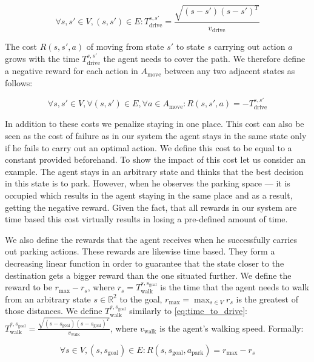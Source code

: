 \begin{equation}
\label{eq:time_to_drive}
\forall s,s' \in V, (s, s') \in E: T_{\mathrm{drive}}^{s,s'}
= \frac{\sqrt{(s - s') {(s - s')}^T}}{v_{\mathrm{drive}}}
\end{equation}

The cost $R(s, s', a)$ of moving from state $s'$ to state $s$ carrying out
action $a$ grows with the time $T_{\mathrm{drive}}^{s,s'}$ the agent needs to cover the path. We therefore
define a negative reward for each action in $A_{\mathrm{move}}$ between any two
adjacent states as follows:

\begin{equation}
\forall s,s' \in V, \forall (s, s') \in E, \forall a \in A_{\mathrm{move}}: R(s, s', a) = -T_{\mathrm{drive}}^{s,s'}
\end{equation}

In addition to these costs we penalize staying in one place. This cost can
also be seen as the cost of failure as in our system the agent stays in the
same state only if he fails to carry out an optimal action. We define this
cost to be equal to a constant provided beforehand. To show the impact of this
cost let us consider an example. The agent stays in an arbitrary state and
thinks that the best decision in this state is to park. However, when he
observes the parking space --- it is occupied which results in the agent
staying in the same place and as a result, getting the negative reward. Given
the fact, that all rewards in our system are time based this cost virtually
results in losing a pre-defined amount of time.

We also define the rewards that the agent receives when he successfully
carries out parking actions. These rewards are likewise time based. They form
a decreasing linear function in order to guarantee that the state closer to
the destination gets a bigger reward than the one situated further. We define
the reward to be $r_{\max} - r_s$, where $r_s = T_{\mathrm{walk}}^{s,s_{\mathrm{goal}}}$ is the
time that the agent needs to walk from an arbitrary state $s \in \mathbb{R}^2$
to the goal, $r_{\max} = \max_{s \in V}r_s$ is the greatest of those
distances. We define $T_{\mathrm{walk}}^{s,s_{\mathrm{goal}}}$ similarly to
\eqref{eq:time_to_drive}: $T_{\mathrm{walk}}^{s,s_{\mathrm{goal}}} = \frac{\sqrt{(s - s_{\mathrm{goal}})
{(s - s_{\mathrm{goal}})}^T}}{v_{\mathrm{walk}}}$, where $v_{\mathrm{walk}}$ is the agent's walking
speed. Formally:

\begin{equation}
\forall s \in V, (s, s_{\mathrm{goal}}) \in E : R(s, s_{\mathrm{goal}}, a_{\mathrm{park}}) = r_{\max} - r_s
\end{equation}


